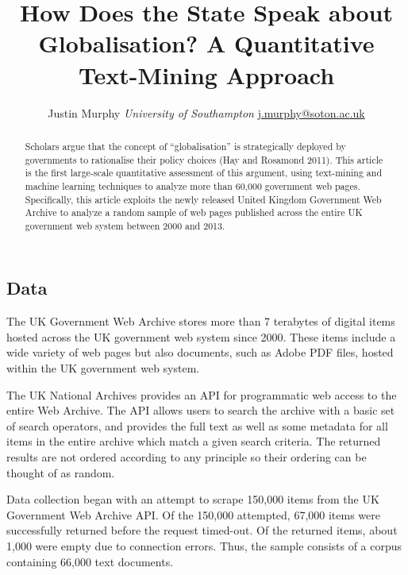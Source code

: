 \documentclass[11pt,article,oneside]{memoir}
\title{How Does the State Speak about Globalisation? A Quantitative Text-Mining
Approach}
\author{\Large Justin Murphy\vspace{0.05in} \newline\normalsize\emph{University of Southampton} \newline\footnotesize \url{j.murphy@soton.ac.uk}\vspace*{0.2in}\newline }
\date{}
\begin{document}
  
\setsansfont[Mapping=tex-text]{Gill Sans} 
\setmonofont[Mapping=tex-text,Scale=0.8]{Consolas}

\doublespacing


\maketitle



\vspace{-4ex}
\begin{abstract}

\noindent Scholars argue that the concept of ``globalisation'' is strategically
deployed by governments to rationalise their policy choices (Hay and
Rosamond 2011). This article is the first large-scale quantitative
assessment of this argument, using text-mining and machine learning
techniques to analyze more than 60,000 government web pages.
Specifically, this article exploits the newly released United Kingdom
Government Web Archive to analyze a random sample of web pages published
across the entire UK government web system between 2000 and 2013.

\end{abstract}

\newpage


\subsection{Data}\label{data}

The UK Government Web Archive stores more than 7 terabytes of digital
items hosted across the UK government web system since 2000. These items
include a wide variety of web pages but also documents, such as Adobe
PDF files, hosted within the UK government web system.

The UK National Archives provides an API for programmatic web access to
the entire Web Archive. The API allows users to search the archive with
a basic set of search operators, and provides the full text as well as
some metadata for all items in the entire archive which match a given
search criteria. The returned results are not ordered according to any
principle so their ordering can be thought of as random.

Data collection began with an attempt to scrape 150,000 items from the
UK Government Web Archive API. Of the 150,000 attempted, 67,000 items
were successfully returned before the request timed-out. Of the returned
items, about 1,000 were empty due to connection errors. Thus, the sample
consists of a corpus containing 66,000 text documents.
\end{document}
